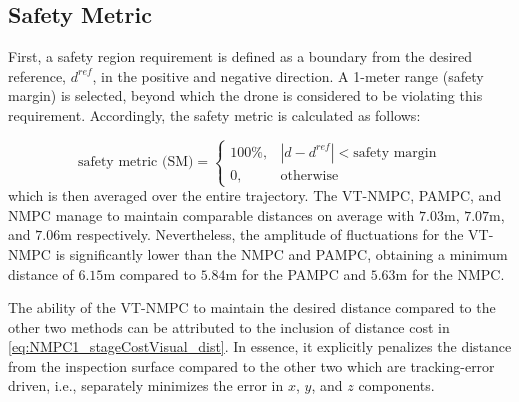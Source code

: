 \documentclass[letterpaper, 10 pt, conference]{ieeeconf}  %
\begin{document}
% 








\subsection{Safety Metric}

First, a safety region requirement is defined as a boundary from the desired reference, $d^{ref}$, in the positive and negative direction. A 1-meter range (safety margin) is selected, beyond which the drone is considered to be violating this requirement. Accordingly, the safety metric is calculated as follows:

\begin{equation}
    \text{safety metric (SM)} = 
    \begin{cases}
      100\%, &   |d - d^{ref}| < \text{safety margin}\\
      0, & \text{otherwise}
    \end{cases}
    \label{eq:safety}
\end{equation}
which is then averaged over the entire trajectory. 
 The VT-NMPC, PAMPC, and NMPC manage to maintain comparable distances on average with $7.03$m, $7.07$m, and $7.06$m respectively. Nevertheless, the amplitude of fluctuations for the VT-NMPC is significantly lower than the NMPC and PAMPC, obtaining a minimum distance of $6.15$m compared to $5.84$m for the PAMPC and $5.63$m for the NMPC.

 The ability of the VT-NMPC to maintain the desired distance compared to the other two methods can be attributed to the inclusion of distance cost in \eqref{eq:NMPC1_stageCostVisual_dist}.  In essence, it explicitly penalizes the distance from the inspection surface compared to the other two which are tracking-error driven, i.e., separately minimizes the error in $x$, $y$, and $z$ components.
\end{document}

